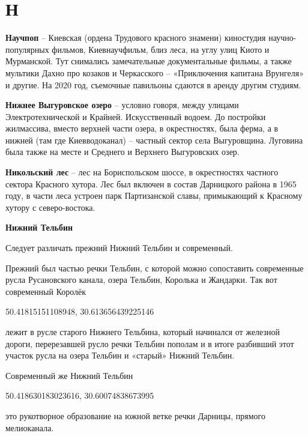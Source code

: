 \chapter*{Н}

\textbf{Научпоп} – Киевская (ордена Трудового красного знамени) киностудия научно-популярных фильмов, Киевнаучфильм, близ леса, на углу улиц Киото и Мурманской. Тут снимались замечательные документальные фильмы, а также мультики Дахно про козаков и Черкасского – «Приключения капитана Врунгеля» и другие. На 2020 год, съемочные павильоны сдаются в аренду другим студиям.\\

\medskip

\textbf{Нижнее Выгуровское озеро} – условно говоря, между улицами Электротехнической и Крайней. Искусственный водоем. До постройки жилмассива, вместо верхней части озера, в окрестностях, была ферма, а в нижней (там где Киевводоканал) – частный сектор села Выгуровщина. Луговина была также на месте и Среднего и Верхнего Выгуровских озер.\\

\medskip

\textbf{Никольский лес} – лес на Бориспольском шоссе, в окрестностях частного сектора Красного хутора. Лес был включен в состав Дарницкого района в 1965 году, в части леса устроен парк Партизанской славы, примыкающий к Красному хутору с северо-востока.\\

\medskip

\textbf{Нижний Тельбин}

Следует различать прежний Нижний Тельбин и современный.

Прежний был частью речки Тельбин, с которой можно сопоставить современные русла Русановского канала, озера Тельбин, Королька и Жандарки. Так вот современный Королёк 

50.41815151108948, 30.613656439225146

лежит в русле старого Нижнего Тельбина, который начинался от железной дороги, перерезавшей русло речки Тельбин пополам и в итоге разбивший этот участок русла на озера Тельбин и «старый» Нижний Тельбин.

Современный же Нижний Тельбин 

50.418630183023616, 30.60074838673995

это рукотворное образование на южной ветке речки Дарницы, прямого мелиоканала.\\

